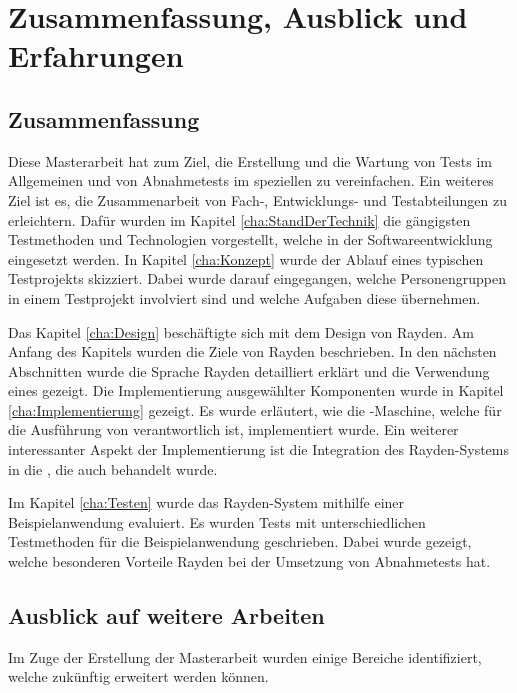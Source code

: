 \chapter{Zusammenfassung, Ausblick und Erfahrungen}
\label{cha:Zusammenfassung}

\section{Zusammenfassung}
Diese Masterarbeit hat zum Ziel, die Erstellung und die Wartung von Tests im Allgemeinen und von Abnahmetests im speziellen zu vereinfachen. Ein weiteres Ziel ist es, die Zusammenarbeit von Fach-, Entwicklungs- und Testabteilungen zu erleichtern. Dafür wurden im Kapitel \ref{cha:StandDerTechnik} die gängigsten Testmethoden und Technologien vorgestellt, welche in der Softwareentwicklung eingesetzt werden. In Kapitel \ref{cha:Konzept} wurde der Ablauf eines typischen Testprojekts skizziert. Dabei wurde darauf eingegangen, welche Personengruppen in einem Testprojekt involviert sind und welche Aufgaben diese übernehmen. 

\SuperPar
Das Kapitel \ref{cha:Design} beschäftigte sich mit dem Design von Rayden. Am Anfang des Kapitels wurden die Ziele von Rayden beschrieben. In den nächsten Abschnitten wurde die Sprache Rayden detailliert erklärt und die Verwendung eines  gezeigt. Die Implementierung ausgewählter Komponenten wurde in Kapitel \ref{cha:Implementierung} gezeigt. Es wurde erläutert, wie die -Maschine, welche für die Ausführung von  verantwortlich ist, implementiert wurde. Ein weiterer interessanter Aspekt der Implementierung ist die Integration des Rayden-Systems in die , die auch behandelt wurde. 

\SuperPar
Im Kapitel \ref{cha:Testen} wurde das Rayden-System mithilfe einer Beispielanwendung evaluiert. Es wurden Tests mit unterschiedlichen Testmethoden für die Beispielanwendung geschrieben. Dabei wurde gezeigt, welche besonderen Vorteile Rayden bei der Umsetzung von Abnahmetests hat.

\pagebreak
\section{Ausblick auf weitere Arbeiten}

Im Zuge der Erstellung der Masterarbeit wurden einige Bereiche identifiziert, welche zukünftig erweitert werden können.\\

